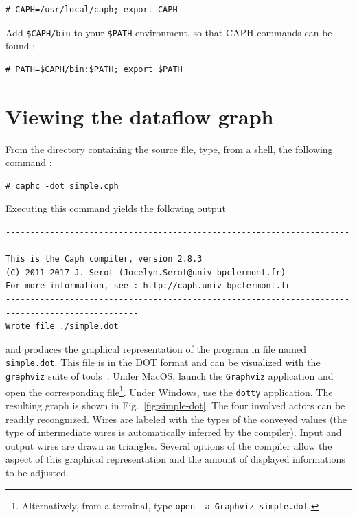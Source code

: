 \begin{lstlisting}[style=BashInputStyle]
# CAPH=/usr/local/caph; export CAPH
\end{lstlisting}

Add \verb|$CAPH/bin| to your \verb|$PATH| environment, so that CAPH commands can be found :

\begin{lstlisting}[style=BashInputStyle]
# PATH=$CAPH/bin:$PATH; export $PATH
\end{lstlisting}

\section{Viewing the dataflow graph}
\label{sec:drawing-network}

From the directory containing the source file, type, from a shell, the following command :  

\begin{lstlisting}[style=BashInputStyle]
# caphc -dot simple.cph
\end{lstlisting}

Executing this command yields the following output 

\begin{lstlisting}[style=BashOutputStyle]
-------------------------------------------------------------------------------------------------
This is the Caph compiler, version 2.8.3
(C) 2011-2017 J. Serot (Jocelyn.Serot@univ-bpclermont.fr)
For more information, see : http://caph.univ-bpclermont.fr
-------------------------------------------------------------------------------------------------
Wrote file ./simple.dot
\end{lstlisting}

and produces the graphical representation of the program in file named
\verb|simple.dot|. This file is in the DOT format and can be visualized with the
\texttt{graphviz} suite of tools~\cite{Graphviz}. Under MacOS, launch the \texttt{Graphviz}
application and open the corresponding file\footnote{Alternatively, from a terminal, type
  \texttt{open -a Graphviz simple.dot}.}. Under Windows, use the \texttt{dotty} application.
The resulting graph is shown in Fig.~\ref{fig:simple-dot}. The four involved actors
can be readily recongnized. Wires are labeled with the types of the conveyed values (the type of
intermediate wires is automatically inferred by the compiler). Input and output wires are drawn as
triangles. Several options of the compiler allow the aspect of this graphical representation and the
amount of displayed informations to be adjusted.

